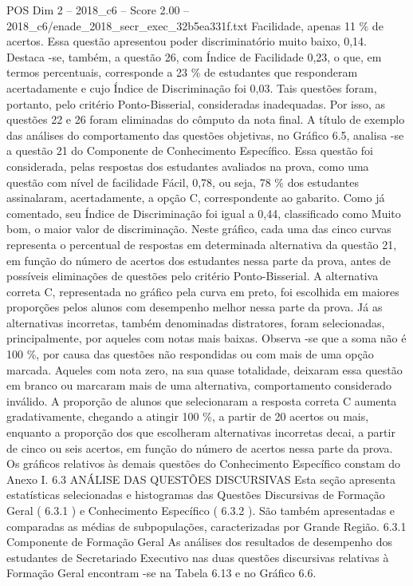\begin{textsample}{POS Dim 2 – 2018\_c6 – Score 2.00 – 2018\_c6/enade\_2018\_secr\_exec\_32b5ea331f.txt}
Facilidade, apenas 11 \% de acertos.
Essa questão apresentou poder discriminatório muito baixo, 0,14.
Destaca -se, também, a questão 26, com Índice de Facilidade 0,23, o que, em termos percentuais, corresponde a 23 \% de estudantes que responderam acertadamente e cujo Índice de Discriminação foi 0,03.
Tais questões foram, portanto, pelo critério Ponto-Bisserial, consideradas inadequadas.
Por isso, as questões 22 e 26 foram eliminadas do cômputo da nota final.
A título de exemplo das análises do comportamento das questões objetivas, no Gráfico 6.5, analisa -se a questão 21 do Componente de Conhecimento Específico.
Essa questão foi considerada, pelas respostas dos estudantes avaliados na prova, como uma questão com nível de facilidade Fácil, 0,78, ou seja, 78 \% dos estudantes assinalaram, acertadamente, a opção C, correspondente ao gabarito.
Como já comentado, seu Índice de Discriminação foi igual a 0,44, classificado como Muito bom, o maior valor de discriminação.
Neste gráfico, cada uma das cinco curvas representa o percentual de respostas em determinada alternativa da questão 21, em função do número de acertos dos estudantes nessa parte da prova, antes de possíveis eliminações de questões pelo critério Ponto-Bisserial.
A alternativa correta C, representada no gráfico pela curva em preto, foi escolhida em maiores proporções pelos alunos com desempenho melhor nessa parte da prova.
Já as alternativas incorretas, também denominadas distratores, foram selecionadas, principalmente, por aqueles com notas mais baixas.
Observa -se que a soma não é 100 \%, por causa das questões não respondidas ou com mais de uma opção marcada.
Aqueles com nota zero, na sua quase totalidade, deixaram essa questão em branco ou marcaram mais de uma alternativa, comportamento considerado inválido.
A proporção de alunos que selecionaram a resposta correta C aumenta gradativamente, chegando a atingir 100 \%, a partir de 20 acertos ou mais, enquanto a proporção dos que escolheram alternativas incorretas decai, a partir de cinco ou seis acertos, em função do número de acertos nessa parte da prova.
Os gráficos relativos às demais questões do Conhecimento Específico constam do Anexo I. 6.3 ANÁLISE DAS QUESTÕES DISCURSIVAS Esta seção apresenta estatísticas selecionadas e histogramas das Questões Discursivas de Formação Geral ( 6.3.1 ) e Conhecimento Específico ( 6.3.2 ).
São também apresentadas e comparadas as médias de subpopulações, caracterizadas por Grande Região. 6.3.1 Componente de Formação Geral As análises dos resultados de desempenho dos estudantes de Secretariado Executivo nas duas questões discursivas relativas à Formação Geral encontram -se na Tabela 6.13 e no Gráfico 6.6.

\end{textsample}
